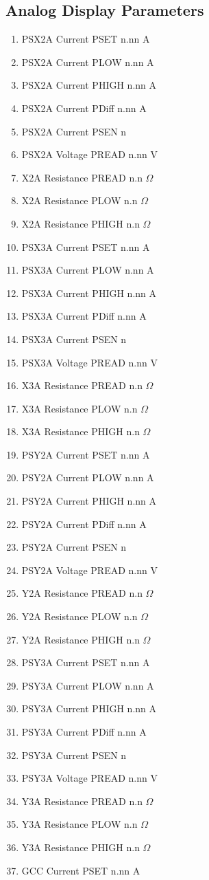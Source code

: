 \documentclass[11pt]{book}		%
\begin{document}
\subsection{Analog Display Parameters}

\begin{enumerate}
 \item PSX2A Current PSET  n.nn A
 \item PSX2A Current PLOW  n.nn A
 \item PSX2A Current PHIGH n.nn A
 \item PSX2A Current PDiff n.nn A
 \item PSX2A Current PSEN  n
 \item PSX2A Voltage PREAD n.nn V
 \item X2A Resistance PREAD n.n $\Omega$
 \item X2A Resistance PLOW n.n $\Omega$
 \item X2A Resistance PHIGH n.n $\Omega$
 \item PSX3A Current PSET  n.nn A
 \item PSX3A Current PLOW  n.nn A
 \item PSX3A Current PHIGH n.nn A
 \item PSX3A Current PDiff n.nn A
 \item PSX3A Current PSEN  n
 \item PSX3A Voltage PREAD n.nn V
 \item X3A Resistance PREAD n.n $\Omega$
 \item X3A Resistance PLOW n.n $\Omega$
 \item X3A Resistance PHIGH n.n $\Omega$
 \item PSY2A Current PSET  n.nn A
 \item PSY2A Current PLOW  n.nn A
 \item PSY2A Current PHIGH n.nn A
 \item PSY2A Current PDiff n.nn A
 \item PSY2A Current PSEN  n
 \item PSY2A Voltage PREAD n.nn V
 \item Y2A Resistance PREAD n.n $\Omega$
 \item Y2A Resistance PLOW n.n $\Omega$
 \item Y2A Resistance PHIGH n.n $\Omega$
 \item PSY3A Current PSET  n.nn A
 \item PSY3A Current PLOW  n.nn A
 \item PSY3A Current PHIGH n.nn A
 \item PSY3A Current PDiff n.nn A
 \item PSY3A Current PSEN  n
 \item PSY3A Voltage PREAD n.nn V
 \item Y3A Resistance PREAD n.n $\Omega$
 \item Y3A Resistance PLOW n.n $\Omega$
 \item Y3A Resistance PHIGH n.n $\Omega$
 \item GCC Current PSET  n.nn A


\end{enumerate}
\end{document}
